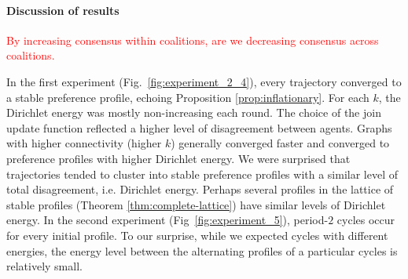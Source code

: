 \documentclass[conference]{ieeeconf}
\newcommand{\A}{\mathcal{A}}
\renewcommand{\P}{\mathcal{P}}
\newcommand{\Pref}{\mathsf{Pre}}
\DeclareMathOperator{\Pre}{Prefix}
\DeclareMathOperator{\Post}{Suffix}
\begin{document}
\paragraph*{Discussion of results}
\textcolor{red}{By increasing consensus within coalitions, are we decreasing consensus across coalitions.}

In the first experiment (Fig.~\ref{fig:experiment_2_4}), every trajectory converged to a stable preference profile, echoing Proposition \ref{prop:inflationary}. For each $k$, the Dirichlet energy was mostly non-increasing each round. The choice of the join update function reflected a higher level of disagreement between agents. Graphs with higher connectivity (higher $k$) generally converged faster and converged to preference profiles with higher Dirichlet energy. We were surprised that trajectories tended to cluster into stable preference profiles with a similar level of total disagreement, i.e. Dirichlet energy. Perhaps several profiles in the lattice of stable profiles (Theorem \ref{thm:complete-lattice}) have similar levels of Dirichlet energy. In the second experiment (Fig~\ref{fig:experiment_5}), period-$2$ cycles occur for every initial profile. To our surprise, while we expected cycles with different energies, the energy level between the alternating profiles of a particular cycles is relatively small.



\end{document}
